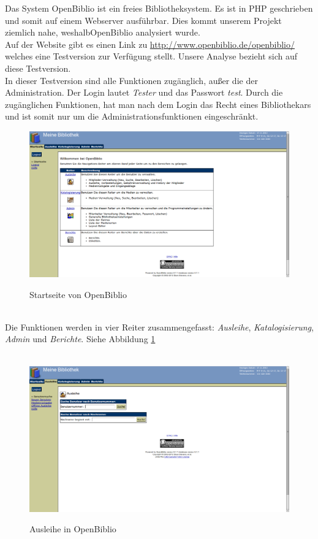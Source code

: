 \documentclass[fontsize=12pt,paper=a4,twoside]{scrartcl}
\begin{document}
Das System OpenBiblio ist ein freies Bibliotheksystem. 
Es ist in PHP geschrieben und somit
auf einem Webserver ausführbar. Dies kommt unserem 
Projekt ziemlich nahe, weshalbOpenBiblio analysiert wurde.\\
Auf der Website gibt es einen Link zu 
\url{http://www.openbiblio.de/openbiblio/} welches eine 
Testversion zur Verfügung stellt. Unsere Analyse bezieht 
sich auf diese Testversion.\\
In dieser Testversion sind alle Funktionen zugänglich, 
außer die der Administration. Der Login lautet \emph{Tester} und 
das Passwort \emph{test}. Durch die zugänglichen Funktionen, hat
man nach dem Login das Recht eines Bibliothekars und ist somit 
nur um die Administrationsfunktionen eingeschränkt.\\
\begin{figure}[h]
\caption{Startseite von OpenBiblio}
\includegraphics[width=1\textwidth]{OpenBiblio/startseite_loggedin.png}
\label{startseite-openbiblio}
\end{figure}
\\
Die Funktionen werden in vier Reiter zusammengefasst: \emph{Ausleihe}, \emph{Katalogisierung}, 
\emph{Admin} und \emph{Berichte}. Siehe Abbildung \ref{startseite-openbiblio}\\
\\
\begin{figure}[h]
\caption{Ausleihe in OpenBiblio}
\includegraphics[width=1\textwidth]{OpenBiblio/reiter_ausleihe.png}
\label{ausleihe-openbiblio}
\end{figure}
\end{document}
